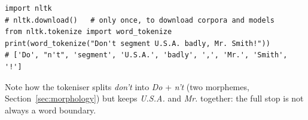 \begin{verbatim}
import nltk
# nltk.download()   # only once, to download corpora and models
from nltk.tokenize import word_tokenize
print(word_tokenize("Don't segment U.S.A. badly, Mr. Smith!"))
# ['Do', "n't", 'segment', 'U.S.A.', 'badly', ',', 'Mr.', 'Smith', '!']
\end{verbatim}

Note how the tokeniser splits \emph{don't} into \emph{Do} + \emph{n't} (two
morphemes, Section~\ref{sec:morphology}) but keeps \emph{U.S.A.} and \emph{Mr.}
together: the full stop is not always a word boundary.
